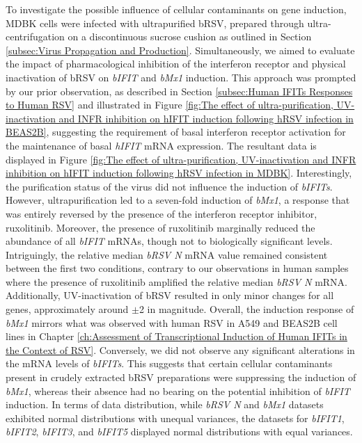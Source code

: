 To investigate the possible influence of cellular contaminants on gene induction, MDBK cells were infected with ultrapurified bRSV, prepared through ultra-centrifugation on a discontinuous sucrose cushion as outlined in Section \ref{subsec:Virus Propagation and Production}. Simultaneously, we aimed to evaluate the impact of pharmacological inhibition of the interferon receptor and physical inactivation of bRSV on \textit{bIFIT} and \textit{bMx1} induction. This approach was prompted by our prior observation, as described in Section \ref{subsec:Human IFITs Responses to Human RSV} and illustrated in Figure \ref{fig:The effect of ultra-purification, UV-inactivation and INFR inhibition on hIFIT induction following hRSV infection in BEAS2B}, suggesting the requirement of basal interferon receptor activation for the maintenance of basal \textit{hIFIT} mRNA expression. The resultant data is displayed in Figure \ref{fig:The effect of ultra-purification, UV-inactivation and INFR inhibition on hIFIT induction following hRSV infection in MDBK}. Interestingly, the purification status of the virus did not influence the induction of \textit{bIFITs}. However, ultrapurification led to a seven-fold induction of \textit{bMx1}, a response that was entirely reversed by the presence of the interferon receptor inhibitor, ruxolitinib. Moreover, the presence of ruxolitinib marginally reduced the abundance of all \textit{bIFIT} mRNAs, though not to biologically significant levels. Intriguingly, the relative median \textit{bRSV N} mRNA value remained consistent between the first two conditions, contrary to our observations in human samples where the presence of ruxolitinib amplified the relative median \textit{bRSV N} mRNA. Additionally, UV-inactivation of bRSV resulted in only minor changes for all genes, approximately around \(\pm\)2 in magnitude. Overall, the induction response of \textit{bMx1} mirrors what was observed with human RSV in A549 and BEAS2B cell lines in Chapter \ref{ch:Assessment of Transcriptional Induction of Human IFITs in the Context of RSV}. Conversely, we did not observe any significant alterations in the mRNA levels of \textit{bIFITs}. This suggests that certain cellular contaminants present in crudely extracted bRSV preparations were suppressing the induction of \textit{bMx1}, whereas their absence had no bearing on the potential inhibition of \textit{bIFIT} induction. In terms of data distribution, while \textit{bRSV N} and \textit{bMx1} datasets exhibited normal distributions with unequal variances, the datasets for \textit{bIFIT1}, \textit{bIFIT2}, \textit{bIFIT3}, and \textit{bIFIT5} displayed normal distributions with equal variances.

